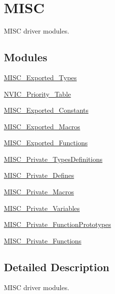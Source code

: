 \hypertarget{group___m_i_s_c}{}\section{M\+I\+SC}
\label{group___m_i_s_c}


M\+I\+SC driver modules.  


\subsection*{Modules}
\begin{DoxyCompactItemize}
\item 
\mbox{\hyperlink{group___m_i_s_c___exported___types}{M\+I\+S\+C\+\_\+\+Exported\+\_\+\+Types}}
\item 
\mbox{\hyperlink{group___n_v_i_c___priority___table}{N\+V\+I\+C\+\_\+\+Priority\+\_\+\+Table}}
\item 
\mbox{\hyperlink{group___m_i_s_c___exported___constants}{M\+I\+S\+C\+\_\+\+Exported\+\_\+\+Constants}}
\item 
\mbox{\hyperlink{group___m_i_s_c___exported___macros}{M\+I\+S\+C\+\_\+\+Exported\+\_\+\+Macros}}
\item 
\mbox{\hyperlink{group___m_i_s_c___exported___functions}{M\+I\+S\+C\+\_\+\+Exported\+\_\+\+Functions}}
\item 
\mbox{\hyperlink{group___m_i_s_c___private___types_definitions}{M\+I\+S\+C\+\_\+\+Private\+\_\+\+Types\+Definitions}}
\item 
\mbox{\hyperlink{group___m_i_s_c___private___defines}{M\+I\+S\+C\+\_\+\+Private\+\_\+\+Defines}}
\item 
\mbox{\hyperlink{group___m_i_s_c___private___macros}{M\+I\+S\+C\+\_\+\+Private\+\_\+\+Macros}}
\item 
\mbox{\hyperlink{group___m_i_s_c___private___variables}{M\+I\+S\+C\+\_\+\+Private\+\_\+\+Variables}}
\item 
\mbox{\hyperlink{group___m_i_s_c___private___function_prototypes}{M\+I\+S\+C\+\_\+\+Private\+\_\+\+Function\+Prototypes}}
\item 
\mbox{\hyperlink{group___m_i_s_c___private___functions}{M\+I\+S\+C\+\_\+\+Private\+\_\+\+Functions}}
\end{DoxyCompactItemize}


\subsection{Detailed Description}
M\+I\+SC driver modules. 

